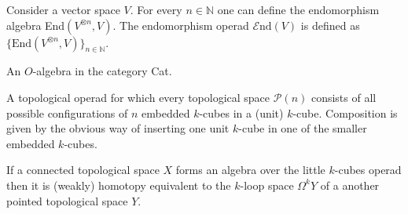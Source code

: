 	
	\begin{example}
		Consider a vector space $V$. For every $n\in\mathbb{N}$ one can define the endomorphism algebra End$(V^{\otimes n}, V)$. The endomorphism operad $\mathcal{E}\text{nd}(V)$ is defined as $\{\text{End}(V^{\otimes n}, V)\}_{n\in\mathbb{N}}$.
	\end{example}

        \begin{example}
                An $O$-algebra in the category Cat.
        \end{example}
        
	\begin{example}
		A topological operad for which every topological space $\mathcal{P}(n)$ consists of all possible configurations of $n$ embedded $k$-cubes in a (unit) $k$-cube. Composition is given by the obvious way of inserting one unit $k$-cube in one of the smaller embedded $k$-cubes.
	\end{example}
	\begin{property}
		If a connected topological space $X$ forms an algebra over the little $k$-cubes operad then it is (weakly) homotopy equivalent to the $k$-loop space $\Omega^kY$ of a another pointed topological space $Y$.
	\end{property}
